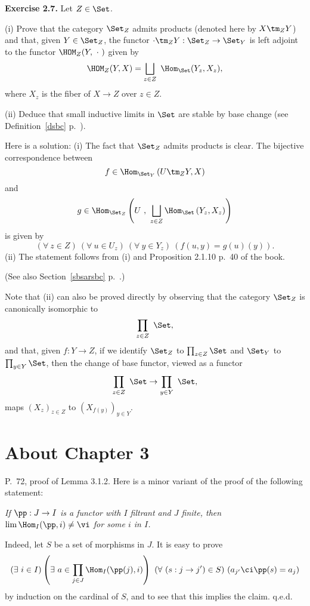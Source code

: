 \documentclass[12pt]{article}
\theoremstyle{remark}
\theoremstyle{definition}
\begin{document}
\nn\textbf{Exercise 2.7.} Let $Z\in\Set$.

\nn(i) Prove that the category $\Set_Z$ admits products (denoted here by $X\tm_Z Y$) and that, given $Y\in\Set_Z$, the functor $\cdot\tm_ZY:\Set_Z\to\Set_Y$ is left adjoint to the functor $\HOM_Z(Y,\ \cdot\ )$ given by 
$$
\HOM_Z(Y, X)=\bigsqcup_{z\in Z}\ \Hom_{\Set}(Y_z,X_z),
$$ 
where $X_z$ is the fiber of $X\to Z$ over $z\in Z$.

\nn(ii) Deduce that small inductive limits in $\Set$ are stable by base change (see Definition~\ref{dsbc} p.~).

Here is a solution: (i) The fact that $\Set_Z$ admits products is clear. The bijective correspondence between 
$$
f\in\Hom_{\Set_Y}\left(U\tm_ZY,X\right)
$$ 
and 
$$
g\in\Hom_{\Set_Z}\left(U\ ,\ \bigsqcup_{z\in Z}\Hom_\Set\left(Y_z,X_z\right)\right)
$$ 
is given by 
$$
(\forall\ z\in Z)\ \left(\forall\ u\in U_z\right)\ \left(\forall\ y\in Y_z\right)\ (f(u,y)=g(u)(y)).
$$ 
(ii) The statement follows from (i) and Proposition 2.1.10 p.~40 of the book.

(See also Section~\ref{sbsarsbc} p.~.)

Note that (ii) can also be proved directly by observing that the category $\Set_Z$ is canonically isomorphic to 
$$
\prod_{z\in Z}\ \Set,
$$ 
and that, given $f:Y\to Z$, if we identify $\Set_Z$ to $\prod_{z\in Z}\Set$ and $\Set_Y$ to $\prod_{y\in Y}\Set$, then the change of base functor, viewed as a functor 
$$
\prod_{z\in Z}\ \Set\to\prod_{y\in Y}\ \Set,
$$ 
maps $(X_z)_{z\in Z}$ to $(X_{f(y)})_{y\in Y}$.


\section{About Chapter 3}


\begin{s} 
P.~72, proof of Lemma 3.1.2. Here is a minor variant of the proof of the following statement: 

\emph{If $\pp:J\to I$ is a functor with $I$ filtrant and $J$ finite, then $\lim\Hom_I(\pp,i)\neq\vi$ for some $i$ in $I$.} 

Indeed, let $S$ be a set of morphisms in $J$. It is easy to prove 
$$
(\exists\ i\in I)\left(\exists\ a\in\prod_{j\in J}\Hom_I(\pp(j),i)\right)\ (\forall\ (s:j\to j')\in S)\ (a_{j'}\ci\pp(s)=a_j) 
$$ 
by induction on the cardinal of $S$, and to see that this implies the claim. q.e.d.
\end{s}
\end{document}
